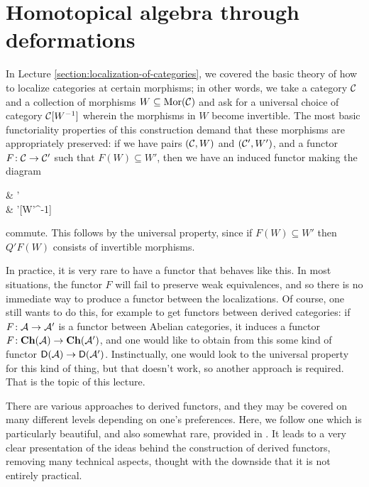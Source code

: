 
\section{Homotopical algebra through deformations}\label{lecture:homotopical-algebra-through-deformations}
In Lecture \ref{section:localization-of-categories}, we covered the basic theory of how to localize categories at certain morphisms; in other words, we take a category \(\mathcal{C}\) and
a collection of morphisms \(W\subseteq\operatorname{Mor}(\mathcal{C})\) and ask for a universal choice of category \(\mathcal{C}[W^{-1}]\) wherein the morphisms in \(W\) become invertible. The most basic functoriality
properties of this construction demand that these morphisms are appropriately preserved: if we have pairs \((\mathcal{C},W)\) and \((\mathcal{C}',W')\), and a functor \(F\!:\mathcal{C}\to\mathcal{C}'\) such that \(F(W)\subseteq W'\),
then we have an induced functor making the diagram
\begin{diagram*}
	\calC\ar[r,"F"]\ar[d,"Q"'] & \calC'\ar[d,"Q'"] \\
	\calC[W^{-1}]\ar[r,dashed] & \calC'[W'^{-1}]
\end{diagram*}
commute. This follows by the universal property, since if \(F(W)\subseteq W'\) then \(Q'F(W)\) consists of invertible morphisms.

In practice, it is very rare to have a functor that behaves like this. In most situations, the functor \(F\) will fail to preserve weak equivalences, and so there is no immediate way
to produce a functor between the localizations. Of course, one still wants to do this, for example to get functors between derived categories: if \(F\!:\mathcal{A}\to\mathcal{A}'\) is a functor
between Abelian categories, it induces a functor \(F\!:\mathbf{Ch}(\mathcal{A})\to\mathbf{Ch}(\mathcal{A}')\), and one would like to obtain from this some kind of functor \(\mathsf{D}(\mathcal{A})\to\mathsf{D}(\mathcal{A}')\). Instinctually,
one would look to the universal property for this kind of thing, but that doesn't work, so another approach is required. That is the topic of this lecture.

There are various approaches to derived functors, and they may be covered on many different levels depending on one's preferences. Here, we follow one which is particularly beautiful, and also
somewhat rare, provided in \cite{riehl-categorical-homotopy-theory}. It leads to a very clear presentation of the ideas behind the construction of derived functors,
removing many technical aspects, thought with the downside that it is not entirely practical.

